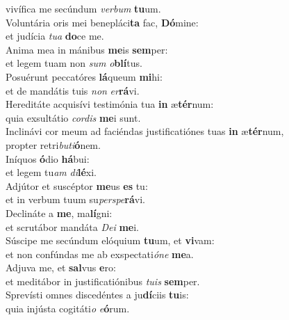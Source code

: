\oddverse vivífica me secúndum \textit{ver}\textit{bum} \textbf{tu}um.\\
\evenverse Voluntária oris mei benepláci\textbf{ta} fac, \textbf{Dó}mine:~\*\\
\evenverse et judícia \textit{tu}\textit{a} \textbf{do}ce me.\\
\oddverse Anima mea in mánibus \textbf{me}is \textbf{sem}per:~\*\\
\oddverse et legem tuam non \textit{sum} \textit{o}\textbf{blí}tus.\\
\evenverse Posuérunt peccatóres \textbf{lá}queum \textbf{mi}hi:~\*\\
\evenverse et de mandátis tuis \textit{non} \textit{er}\textbf{rá}vi.\\
\oddverse Hereditáte acquisívi testimónia tua \textbf{in} æ\textbf{tér}num:~\*\\
\oddverse quia exsultátio \textit{cor}\textit{dis} \textbf{me}i sunt.\\
\evenverse Inclinávi cor meum ad faciéndas justificatiónes tuas \textbf{in} æ\textbf{tér}num,~\*\\
\evenverse propter retri\textit{bu}\textit{ti}\textbf{ó}nem.\\
\oddverse Iníquos \textbf{ó}dio \textbf{há}bui:~\*\\
\oddverse et legem tu\textit{am} \textit{di}\textbf{lé}xi.\\
\evenverse Adjútor et suscéptor \textbf{me}us \textbf{es} tu:~\*\\
\evenverse et in verbum tuum su\textit{per}\textit{spe}\textbf{rá}vi.\\
\oddverse Declináte a \textbf{me}, ma\textbf{lí}gni:~\*\\
\oddverse et scrutábor mandáta \textit{De}\textit{i} \textbf{me}i.\\
\evenverse Súscipe me secúndum elóquium \textbf{tu}um, et \textbf{vi}vam:~\*\\
\evenverse et non confúndas me ab exspectati\textit{ó}\textit{ne} \textbf{me}a.\\
\oddverse Adjuva me, et \textbf{sal}vus \textbf{e}ro:~\*\\
\oddverse et meditábor in justificatiónibus \textit{tu}\textit{is} \textbf{sem}per.\\
\evenverse Sprevísti omnes discedéntes a ju\textbf{dí}ciis \textbf{tu}is:~\*\\
\evenverse quia injústa cogitáti\textit{o} \textit{e}\textbf{ó}rum.\\

